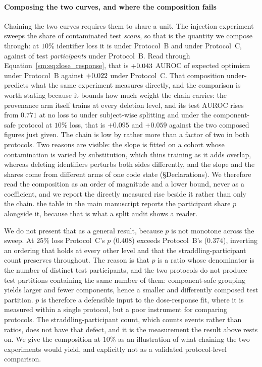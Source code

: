 \documentclass[11pt]{article}
\begin{document}
\paragraph{Composing the two curves, and where the composition fails}
Chaining the two curves requires them to share a unit. The injection
experiment sweeps the share of contaminated test \emph{scans}, so that
is the quantity we compose through: at $10\%$ identifier loss it is
\ProvScanTenSubject{} under Protocol~B and \ProvScanTenSafe{} under
Protocol~C, against \ProvParticipantTenSubject{} of test
\emph{participants} under Protocol~B. Read through
Equation~\ref{sm:eq:dose_response}, that is $+0.043{}$ AUROC
of expected optimism under Protocol~B against $+0.022{}$
under Protocol~C. That composition under-predicts what the same
experiment measures directly, and the comparison is worth stating
because it bounds how much weight the chain carries: the provenance arm
itself trains at every deletion level, and its test AUROC rises from
$0.771$ at no loss to \ProvSubjectAUROCTen{} under subject-wise splitting
and \ProvSafeAUROCTen{}
under the component-safe protocol at $10\%$ loss, that is $+0.095$ and
$+0.059$ against the two composed figures just given. The chain is low
by rather more than a factor of two in both protocols. Two reasons are visible: the slope is fitted on
a cohort whose contamination is varied by substitution, which thins
training as it adds overlap, whereas deleting identifiers perturbs both
sides differently, and the slope
and the shares come from different arms of one code state
(\S Declarations). We therefore read the composition as an order of
magnitude and a lower bound, never as a coefficient, and we report the
directly measured rise beside it rather than only the chain. the table in the main manuscript reports the
participant share $p$ alongside it, because that is what a split audit
shows a reader.

We do not present that as a general result, because $p$ is not
monotone across the sweep. At $25\%$ loss Protocol~C's $p$ ($0.408$)
exceeds Protocol~B's ($0.374$), inverting an ordering that holds at
every other level and that the straddling-participant count preserves
throughout. The reason is that $p$ is a ratio whose denominator is the
number of distinct test participants, and the two protocols do not
produce test partitions containing the same number of them:
component-safe grouping yields larger and fewer components, hence a
smaller and differently composed test partition. $p$ is therefore a
defensible input to the dose-response fit, where it is measured within
a single protocol, but a poor instrument for comparing protocols. The
straddling-participant count, which counts events rather than ratios,
does not have that defect, and it is the measurement the result above
rests on. We give the composition at $10\%$ as an illustration of what
chaining the two experiments would yield, and explicitly not as a
validated protocol-level comparison.
\end{document}
